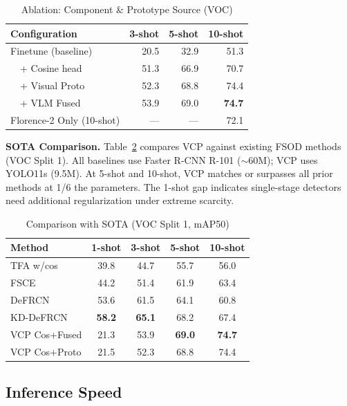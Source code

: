 \documentclass[conference]{IEEEtran}
\begin{document}
\begin{table}[ht]
\centering\footnotesize
\caption{Ablation: Component \& Prototype Source (VOC)}
\label{tab:ablation}
\begin{tabular}{lrrr}
\toprule
Configuration & 3-shot & 5-shot & 10-shot \\
\midrule
Finetune (baseline) & 20.5 & 32.9 & 51.3 \\
~~+ Cosine head    & 51.3 & 66.9 & 70.7 \\
~~+ Visual Proto   & 52.3 & 68.8 & 74.4 \\
~~+ VLM Fused      & 53.9 & 69.0 & \textbf{74.7} \\
Florence-2 Only (10-shot) & --- & --- & 72.1 \\
\bottomrule
\end{tabular}
\end{table}

\textbf{SOTA Comparison.} Table~\ref{tab:sota} compares VCP against existing FSOD methods (VOC Split 1). All baselines use Faster R-CNN R-101 ($\sim$60M); VCP uses YOLO11s (9.5M). At 5-shot and 10-shot, VCP matches or surpasses all prior methods at 1/6 the parameters. The 1-shot gap indicates single-stage detectors need additional regularization under extreme scarcity.

\begin{table}[ht]
\centering\footnotesize
\caption{Comparison with SOTA (VOC Split 1, mAP50)}
\label{tab:sota}
\begin{tabular}{lcccc}
\toprule
Method & 1-shot & 3-shot & 5-shot & 10-shot \\
\midrule
TFA w/cos        & 39.8 & 44.7 & 55.7 & 56.0 \\
FSCE             & 44.2 & 51.4 & 61.9 & 63.4 \\
DeFRCN           & 53.6 & 61.5 & 64.1 & 60.8 \\
KD-DeFRCN        & \textbf{58.2} & \textbf{65.1} & 68.2 & 67.4 \\
\midrule
VCP Cos+Fused    & 21.3 & 53.9 & \textbf{69.0} & \textbf{74.7} \\
VCP Cos+Proto    & 21.5 & 52.3 & 68.8 & 74.4 \\
\bottomrule
\end{tabular}
\end{table}

\subsection{Inference Speed}
\end{document}
